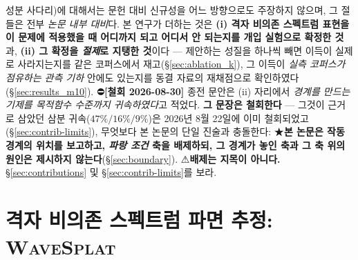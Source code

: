 \documentclass[11pt]{report}
\numberwithin{equation}{chapter}
\numberwithin{figure}{chapter}
\numberwithin{table}{chapter}
\newcommand{\WS}{\textsc{WaveSplat}}
\begin{document}
성분 사다리)에 대해서는 문헌 대비 신규성을 어느 방향으로도 주장하지 않으며, 그 절들은
전부 \emph{논문 내부 대비}다.
본 연구가 더하는 것은
\textbf{(i) 격자 비의존 스펙트럼 표현을 이 문제에 적용했을 때 어디까지 되고 어디서
안 되는지를 개입 실험으로 확정한 것}과, \textbf{(ii) 그 확정을 \emph{절제}로 지탱한
것}이다 --- 제안하는 성질을 하나씩 빼면 이득이 실제로 사라지는지를 같은 코퍼스에서
재고(\S\ref{sec:ablation_k}), 그 이득이 \emph{실측 코퍼스가 점유하는 관측 기하} 안에도
있는지를 동결 자료의 재채점으로 확인하였다(\S\ref{sec:results_m10}).
⛔\textbf{[철회 2026-08-30]} 종전 문안은 (ii) 자리에서 \emph{경계를 만드는 기제를
목적함수 수준까지 귀속하였다}고 적었다. \textbf{그 문장은 철회한다} --- 그것이 근거로
삼았던 삼분 귀속($47\%/16\%/9\%$)은 2026년 8월 22일에 이미 철회되었고
(\S\ref{sec:contrib-limits}), 무엇보다 본 논문의 단일 진술과 충돌한다:
★\textbf{본 논문은 작동 경계의 위치를 보고하고, \emph{파랑 조건} 축을 배제하되, 그 경계가
놓인 축과 그 축 위의 원인은 제시하지 않는다}(\S\ref{sec:boundary}).
⚠\textbf{배제는 지목이 아니다.}
\S\ref{sec:contributions} 및 \S\ref{sec:contrib-limits}를 보라.

\chapter{격자 비의존 스펙트럼 파면 추정: \WS{}}
\label{chap:wavesplat}

\end{document}
